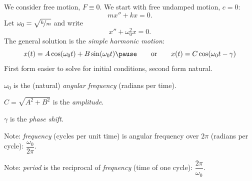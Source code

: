 \documentclass[10pt,aspectratio=169]{beamer}
\begin{document}
\begin{frame}
We consider free motion, $F \equiv 0$.
\pause
We start with free undamped motion, $c = 0$:
\[
mx'' + kx = 0 .
\]
\pause
Let $\omega_0 = \sqrt{\nicefrac{k}{m}}$ and write
\[
x'' + \omega_0^2 x = 0 .
\]
\pause
The general solution is the \emph{simple harmonic motion}:
\[
x(t) = A \cos (\omega_0 t) + B \sin (\omega_0 t) 
\pause
\qquad
\text{or}
\qquad
x(t) = C \cos (\omega_0 t - \gamma) 
\]
\pause
First form easier to solve for initial conditions, second form
natural.

\medskip
\pause

$\omega_0$ is the (natural) \emph{angular frequency} (radians per time).

\pause
$C = \sqrt{A^2+B^2}$ is the \emph{amplitude}.

\pause
$\gamma$ is the \emph{phase shift}.

\medskip
\pause

Note:
\emph{frequency} (cycles per unit time) is
angular frequency over $2\pi$ (radians per cycle):
$\dfrac{\omega_0}{2\pi}$.

\pause

Note:
\emph{period} is the reciprocal of \emph{frequency} (time of one cycle):
$\dfrac{2\pi}{\omega_0}$.
\end{frame}
\end{document}
